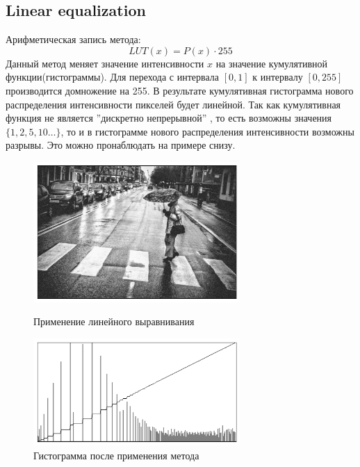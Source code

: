 \documentclass[a4paper,12pt]{article}
\begin{document}
\subsection{Linear equalization}
Арифметическая запись метода:
$$LUT(x) = P(x) \cdot 255$$
Данный метод меняет значение интенсивности $x$ на значение кумулятивной функции(гистограммы). Для перехода с интервала $[0,1]$ к интервалу $[0,255]$ производится домножение на 255. В результате кумулятивная гистограмма нового распределения интенсивности пикселей будет линейной. Так как кумулятивная функция не является ''дискретно непрерывной'' , то есть возможны значения $\{1,2,5,10\ldots\}$, то и в гистограмме нового распределения интенсивности возможны разрывы. Это можно пронаблюдать на примере снизу.
\begin{figure}[H]
    \centering \includegraphics[width=0.7\textwidth]{images/linear.png}
    \caption{Применение линейного выравнивания}
    \centering \includegraphics[width=0.7\textwidth]{images/linear_hist.png}
    \caption{Гистограмма после применения метода}
\end{figure}
\end{document}
